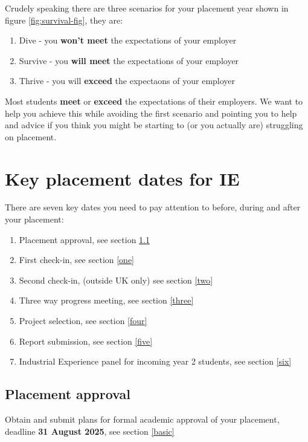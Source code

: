 \documentclass[
]{book}
\providecommand{\tightlist}{%
  \setlength{\itemsep}{0pt}\setlength{\parskip}{0pt}}
\begin{document}
Crudely speaking there are three scenarios for your placement year shown in figure \ref{fig:survival-fig}, they are:

\begin{enumerate}
\def\labelenumi{\arabic{enumi}.}
\tightlist
\item
  Dive - you \textbf{won't meet} the expectations of your employer
\item
  Survive - you \textbf{will meet} the expectations of your employer
\item
  Thrive - you will \textbf{exceed} the expectaons of your employer
\end{enumerate}

Most students \textbf{meet} or \textbf{exceed} the expectations of their employers. We want to help you achieve this while avoiding the first scenario and pointing you to help and advice if you think you might be starting to (or you actually are) struggling on placement.

\section{Key placement dates for IE}\label{keydates}

There are seven key dates you need to pay attention to before, during and after your placement:

\begin{enumerate}
\def\labelenumi{\arabic{enumi}.}
\tightlist
\item
  Placement approval, see section \ref{approval}
\item
  First check-in, see section \ref{one}
\item
  Second check-in, (outside UK only) see section \ref{two}
\item
  Three way progress meeting, see section \ref{three}
\item
  Project selection, see section \ref{four}
\item
  Report submission, see section \ref{five}
\item
  Industrial Experience panel for incoming year 2 students, see section \ref{six}
\end{enumerate}

\subsection{Placement approval}\label{approval}

Obtain and submit plans for formal academic approval of your placement, deadline \textbf{31 August 2025}, see section \ref{basic}
\end{document}
